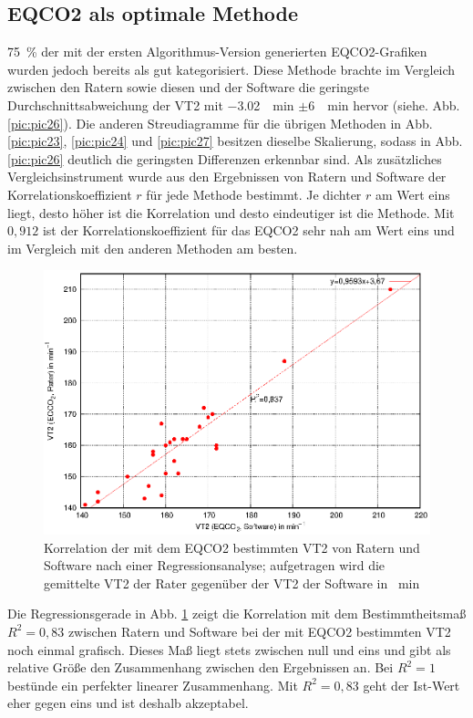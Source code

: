 \subsection{\acrshort{EQCO2} als optimale Methode}
%
75~\% der mit der ersten Algorithmus-Version generierten \gls{EQCO2}-Grafiken wurden jedoch bereits als gut kategorisiert. Diese Methode brachte im Vergleich zwischen den Ratern sowie diesen und der Software die geringste Durchschnittsabweichung der VT2 mit \SI{-3,02}{\per\minute} $\pm$\SI{6}{\per\minute} hervor (siehe. Abb. \ref{pic:pic26}). Die anderen Streudiagramme für die übrigen Methoden in Abb. \ref{pic:pic23}, \ref{pic:pic24} und \ref{pic:pic27} besitzen dieselbe Skalierung, sodass in Abb. \ref{pic:pic26} deutlich die geringsten Differenzen erkennbar sind. Als zusätzliches Vergleichsinstrument wurde aus den Ergebnissen von Ratern und Software der Korrelationskoeffizient $r$ für jede Methode bestimmt. Je dichter $r$ am Wert eins liegt, desto höher ist die Korrelation und desto eindeutiger ist die Methode. Mit $0,912$ ist der Korrelationskoeffizient für das \gls{EQCO2} sehr nah am Wert eins und im Vergleich mit den anderen Methoden am besten.
%
\begin{figure}[H]
	\centering
	\includegraphics[scale=0.95]{Bilder/korr_eqco2.eps}
	\caption[Korrelation der \acrshort{EQCO2}-Werte von Ratern und Software]{Korrelation der mit dem \acrshort{EQCO2} bestimmten VT2 von Ratern und Software nach einer Regressionsanalyse; aufgetragen wird die gemittelte VT2 der Rater gegenüber der VT2 der Software in \si{\per\minute}}
	\label{pic:pic28}
\end{figure}
%
Die Regressionsgerade in Abb. \ref{pic:pic28} zeigt die Korrelation mit dem Bestimmtheitsmaß $R^2 = 0,83$ zwischen Ratern und Software bei der mit \gls{EQCO2} bestimmten VT2 noch einmal grafisch. Dieses Maß liegt stets zwischen null und eins und gibt als relative Größe den Zusammenhang zwischen den Ergebnissen an. Bei $R^2 = 1$ bestünde ein perfekter linearer Zusammenhang. Mit $R^2 = 0,83$ geht der Ist-Wert eher gegen eins und ist deshalb akzeptabel.\\
